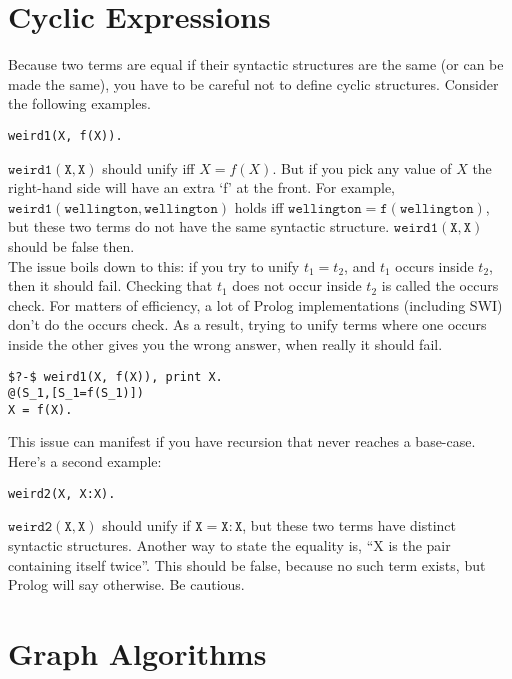 \documentclass[a4paper,12pt]{article}
\newcommand{\kwa}[1]{\mathtt{#1}}
\begin{document}
\section{Cyclic Expressions}

\noindent
Because two terms are equal if their syntactic structures are the same (or can be made the same), you have to be careful not to define cyclic structures. Consider the following examples.

\begin{lstlisting}
weird1(X, f(X)).
\end{lstlisting}

\noindent
$\kwa{weird1(X, X)}$ should unify iff $X = f(X)$. But if you pick any value of $X$ the right-hand side will have an extra `f' at the front. For example, $\kwa{weird1(wellington, wellington)}$ holds iff $\kwa{wellington = f(wellington)}$, but these two terms do not have the same syntactic structure. $\kwa{weird1(X, X)}$ should be false then. \\

\noindent
The issue boils down to this: if you try to unify $t_1 = t_2$, and $t_1$ occurs inside $t_2$, then it should fail. Checking that $t_1$ does not occur inside $t_2$ is called the occurs check. For matters of efficiency, a lot of Prolog implementations (including SWI) don't do the occurs check. As a result, trying to unify terms where one occurs inside the other gives you the wrong answer, when really it should fail.

\begin{lstlisting}
$?-$ weird1(X, f(X)), print X.
@(S_1,[S_1=f(S_1)])
X = f(X).
\end{lstlisting}

\noindent 
This issue can manifest if you have recursion that never reaches a base-case. Here's a second example:

\begin{lstlisting}
weird2(X, X:X).
\end{lstlisting}

\noindent
$\kwa{weird2(X, X)}$ should unify if $\kwa{X = X:X}$, but these two terms have distinct syntactic structures. Another way to state the equality is, ``X is the pair containing itself twice''. This should be false, because no such term exists, but Prolog will say otherwise. Be cautious.

\section{Graph Algorithms}
\end{document}
